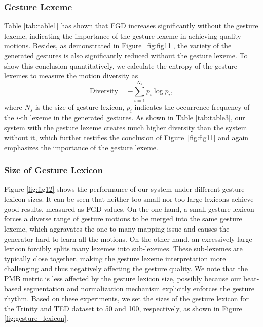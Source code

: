 \documentclass[acmtog,authorversion]{acmart}
\newcommand{\eqword}[1]{{\text{#1}}}
\newcommand{\fig}{Figure{}~}
\begin{document}
\subsubsection{Gesture Lexeme}
\label{subsubsec:gesture_lexeme}
Table \ref{tab:table1} has shown that FGD increases significantly without the gesture lexeme, indicating the importance of the gesture lexeme in achieving quality motions. Besides, as demonstrated in \fig\ref{fig:fig11}, the variety of the generated gestures is also significantly reduced without the gesture lexeme. To show this conclusion quantitatively, we calculate the entropy of the gesture lexemes to measure the motion diversity as
\begin{equation}
    \eqword{Diversity} = -\sum_{i=1}^{N_s}p_i\log{p_i},
\end{equation}
where $N_s$ is the size of gesture lexicon, $p_i$ indicates the occurrence frequency of the $i$-th lexeme in the generated gestures. As shown in Table \ref{tab:table3}, our system with the gesture lexeme creates much higher diversity than the system without it, which further testifies the conclusion of \fig\ref{fig:fig11} and again emphasizes the importance of the gesture lexeme.

\subsubsection{Size of Gesture Lexicon}
Figure \ref{fig:fig12} shows the performance of our system under different gesture lexicon sizes. It can be seen that neither too small nor too large lexicons achieve good results, measured as FGD values. On the one hand, a small gesture lexicon forces a diverse range of gesture motions to be merged into the same gesture lexeme, which aggravates the one-to-many mapping issue and causes the generator hard to learn all the motions. On the other hand, an excessively large lexicon forcibly splits many lexemes into sub-lexemes. These sub-lexemes are typically close together, making the gesture lexeme interpretation more challenging and thus negatively affecting the gesture quality. We note that the PMB metric is less affected by the gesture lexicon size, possibly because our beat-based segmentation and normalization mechanism explicitly enforces the gesture rhythm. Based on these experiments, we set the sizes of the gesture lexicon for the Trinity and TED dataset to 50 and 100, respectively, as shown in Figure \ref{fig:gesture_lexicon}.
\end{document}
